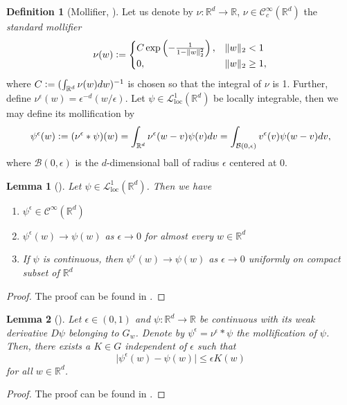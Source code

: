 \documentclass[12pt]{article}
\newtheorem{lemma}[lemma]{Lemma}
\theoremstyle{definition}
\newtheorem{definition}[definition]{Definition}
\numberwithin{equation}{section}
\newcommand{\R}{\mathbb{R}}
\newcommand{\CL}{\mathcal{L}}
\newcommand{\CC}{\mathcal{C}}
\newcommand{\CB}{\mathcal{B}}
\newcommand{\moll}{\nu^{\epsilon}}
\newcommand{\norm}[1]{\lVert{#1}\rVert_2}
\newcommand{\defeq}{\vcentcolon=}
\begin{document}
\begin{definition}[Mollifier, ]
  Let us denote by $\nu : \R^d \rightarrow \R$, $\nu \in \CC^{\infty}_c(\R^d)$ the \emph{standard mollifier}
  \begin{equation*}
    \nu(w) \defeq \begin{cases}
      C \exp\left(-\frac{1}{1 - \norm{w}^2}\right), &\norm{w} < 1 \\
      0, &\norm{w} \geq 1,
    \end{cases}
  \end{equation*}
  where $C \defeq (\int_{\R^d}\nu(w)dw)^{-1}$ is chosen so that the integral of $\nu$ is 1. Further, define $\nu^{\epsilon}(w) = \epsilon^{-d}(w/\epsilon)$. Let $\psi \in \CL^1_{\text{loc}}(\R^d)$ be locally integrable, then we may define its mollification by
  \begin{equation*}
    \psi^{\epsilon}(w) \defeq (\nu^{\epsilon}*\psi)(w) = \int_{\R^d}\nu^{\epsilon}(w-v)\psi(v)dv = \int_{\CB(0,\epsilon)}v^{\epsilon}(v)\psi(w-v)dv,
  \end{equation*}
  where $\CB(0,\epsilon)$ is the $d$-dimensional ball of radius $\epsilon$ centered at 0. 
\end{definition}
\begin{lemma}[]
  \label{lemma:mollifiers}
  Let $\psi \in \CL^1_{\text{loc}}(\R^d)$. Then we have
  \begin{enumerate}[label=(\roman*)]
    \item $\psi^{\epsilon} \in \CC^{\infty}(\R^d)$
    \item $\psi^{\epsilon}(w) \rightarrow \psi(w)$ as $\epsilon \rightarrow 0$ for almost every $w \in \R^d$
    \item If $\psi$ is continuous, then $\psi^{\epsilon}(w) \rightarrow \psi(w)$ as $\epsilon \rightarrow 0$ uniformly on compact subset of $\R^d$
  \end{enumerate}
\end{lemma}
\begin{proof}
  The proof can be found in \cite[pp. 630]{evansPartialDifferentialEquations2010}.
\end{proof}
\begin{lemma}[]
  \label{lemma:mollifier_bound}
  Let $\epsilon \in (0,1)$ and $\psi : \R^d \rightarrow \R$ be continuous with its weak derivative $D\psi$ belonging to $G_w$. Denote by $\psi^{\epsilon}  = \moll * \psi$ the mollification of $\psi$. Then, there exists a $K \in G$ independent of $\epsilon$ such that
  \begin{equation*}
    \lvert\psi^{\epsilon}(w) - \psi(w)\rvert \leq \epsilon K(w)
  \end{equation*}
  for all $w \in \R^d$.
\end{lemma}
\begin{proof}
  The proof can be found in 
  \cite{liStochasticModifiedEquations2019}.
\end{proof}
\end{document}
